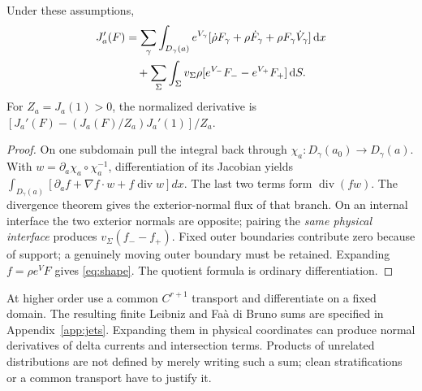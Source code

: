 \begin{theorem}\label{thm:shape}
Under these assumptions,
\begin{align}
 J_a'(F)
 &=\sum_\gamma\int_{D_\gamma(a)}e^{V_\gamma}
 [\dot\rho F_\gamma+\rho\dot F_\gamma+\rho F_\gamma\dot V_\gamma]\,\mathrm d x\notag\\
 &\quad+\sum_\Sigma\int_\Sigma v_\Sigma\rho
 [e^{V_-}F_- -e^{V_+}F_+]\,\mathrm d S.
 \label{eq:shape}
\end{align}
For $Z_a=J_a(1)>0$, the normalized derivative is
$[J_a'(F)-(J_a(F)/Z_a)J_a'(1)]/Z_a$.
\end{theorem}
\begin{proof}
On one subdomain pull the integral back through $\chi_a:D_\gamma(a_0)\to D_\gamma(a)$. With $w=\partial_a\chi_a\circ\chi_a^{-1}$, differentiation of its Jacobian yields
$\int_{D_\gamma(a)}[\partial_af+\nabla f\cdot w+f\operatorname{div}w]dx$.
The last two terms form $\operatorname{div}(fw)$. The divergence theorem gives the exterior-normal flux of that branch. On an internal interface the two exterior normals are opposite; pairing the \emph{same physical interface} produces $v_\Sigma(f_--f_+)$. Fixed outer boundaries contribute zero because of support; a genuinely moving outer boundary must be retained. Expanding $f=\rho e^VF$ gives \eqref{eq:shape}. The quotient formula is ordinary differentiation.
\end{proof}

At higher order use a common $C^{r+1}$ transport and differentiate on a fixed domain. The resulting finite Leibniz and Fa\`a di Bruno sums are specified in Appendix~\ref{app:jets}. Expanding them in physical coordinates can produce normal derivatives of delta currents and intersection terms. Products of unrelated distributions are not defined by merely writing such a sum; clean stratifications or a common transport have to justify it.

